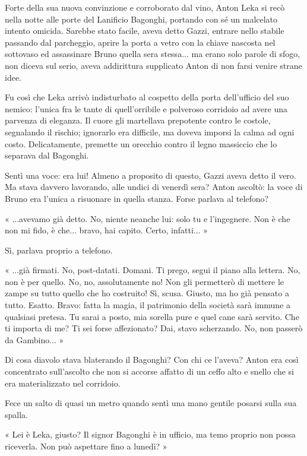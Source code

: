 Forte della sua nuova convinzione e corroborato dal vino, Anton Leka si recò nella notte alle porte del Lanificio Bagonghi, portando con sé un malcelato intento omicida. Sarebbe stato facile, aveva detto Gazzi, entrare nello stabile passando dal parcheggio, aprire la porta a vetro con la chiave nascosta nel sottovaso ed assassinare Bruno quella sera stessa... ma erano solo parole di sfogo, non diceva sul serio, aveva addirittura supplicato Anton di non farsi venire strane idee.

Fu così che Leka arrivò indisturbato al cospetto della porta dell'ufficio del suo nemico: l'unica fra le tante di quell'orribile e polveroso corridoio ad avere una parvenza di eleganza. Il cuore gli martellava prepotente contro le costole, segnalando il rischio; ignorarlo era difficile, ma doveva imporsi la calma ad ogni costo. Delicatamente, premette un orecchio contro il legno massiccio che lo separava dal Bagonghi.

Sentì una voce: era lui! Almeno a proposito di questo, Gazzi aveva detto il vero. Ma stava davvero lavorando, alle undici di venerdì sera? Anton ascoltò: la voce di Bruno era l'unica a risuonare in quella stanza. Forse parlava al telefono?

« ...avevamo già detto. No, niente neanche lui: solo tu e l'ingegnere. Non è che non mi fido, è che... bravo, hai capito. Certo, infatti... »

Sì, parlava proprio a telefono.

« ...già firmati. No, post-datati. Domani. Ti prego, segui il piano alla lettera. No, non è per quello. No, no, assolutamente no! Non gli permetterò di mettere le zampe su tutto quello che ho costruito! Sì, scusa. Giusto, ma ho già pensato a tutto. Esatto. Bravo: fatta la magia, il patrimonio della società sarà immune a qualsiasi pretesa. Tu sarai a posto, mia sorella pure e quel cane sarà servito. Che ti importa di me? Ti sei forse affezionato? Dai, stavo scherzando. No, non passerò da Gambino... »

Di cosa diavolo stava blaterando il Bagonghi? Con chi ce l'aveva? Anton era così concentrato sull'ascolto che non si accorse affatto di un ceffo alto e snello che si era materializzato nel corridoio.

Fece un salto di quasi un metro quando sentì una mano gentile posarsi sulla sua spalla.

« Lei è Leka, giusto? Il signor Bagonghi è in ufficio, ma temo proprio non possa riceverla. Non può aspettare fino a lunedì? »

